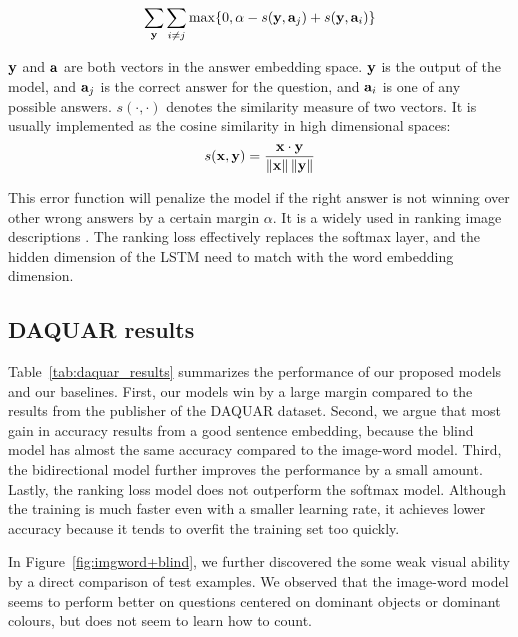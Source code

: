 \begin{equation}
\sum\limits_{\mathbf{y}} \sum\limits_{i \neq j} \max \{0, \alpha-s(\mathbf{y}, \mathbf{a}_j) + s(\mathbf{y}, \mathbf{a}_i) \}
\end{equation}

$\mathbf{y}$ and $\mathbf{a}$ are both vectors in the answer embedding space. $\mathbf{y}$ is the output of the model, and $\mathbf{a}_j$ is the correct answer for the question, and $\mathbf{a}_i$ is one of any possible answers. $s(\cdot, \cdot)$ denotes the similarity measure of two vectors. It is usually implemented as the cosine similarity in high dimensional spaces: 
\begin{equation}
s(\mathbf{x}, \mathbf{y}) = \dfrac{\mathbf{x} \cdot \mathbf{y}} {\left\lVert\mathbf{x}\right\rVert \left\lVert\mathbf{y}\right\rVert}
\end{equation}

This error function will penalize the model if the right answer is not winning over other wrong answers by a certain margin $\alpha$. It is a widely used in ranking image descriptions \cite{kiros14b}. The ranking loss effectively replaces the softmax layer, and the hidden dimension of the LSTM need to match with the word embedding dimension. 

\subsection{DAQUAR results}
\label{sec:daquar_results}
Table~\ref{tab:daquar_results} summarizes the performance of our proposed models and our baselines. First, our models win by a large margin compared to the results from the publisher of the DAQUAR dataset. Second, we argue that most gain in accuracy results from a good sentence embedding, because the blind model has almost the same accuracy compared to the image-word model. Third, the bidirectional model further improves the performance by a small amount. Lastly, the ranking loss model does not outperform the softmax model. Although the training is much faster even with a smaller learning rate, it achieves lower accuracy because it tends to overfit the training set too quickly.

In Figure~\ref{fig:imgword+blind}, we further discovered the some weak visual ability by a direct comparison of test examples. We observed that the image-word model seems to perform better on questions centered on dominant objects or dominant colours, but does not seem to learn how to count.

